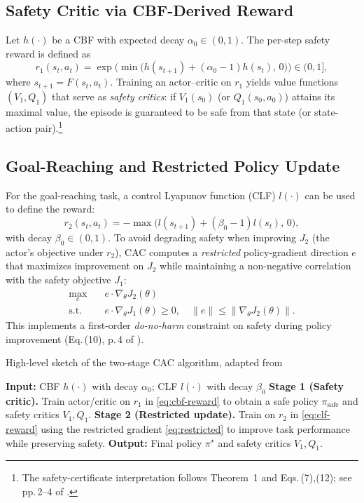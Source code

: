 \documentclass[10pt,conference]{IEEEtran}
\begin{document}
\subsection{Safety Critic via CBF-Derived Reward}
Let $h(\cdot)$ be a CBF with expected decay $\alpha_0\in(0,1)$. The per-step safety reward is defined as
\begin{equation}
r_1(s_t,a_t)=\exp\Big(\min\big(h(s_{t+1})+(\alpha_0-1)h(s_t),\,0\big)\Big)\in(0,1],
\label{eq:cbf-reward}
\end{equation}
where $s_{t+1}=F(s_t,a_t)$. Training an actor--critic on $r_1$ yields value functions $(V_1,Q_1)$ that serve as \emph{safety critics}: if $V_1(s_0)$ (or $Q_1(s_0,a_0)$) attains its maximal value, the episode is guaranteed to be safe from that state (or state-action pair).\footnote{The safety-certificate interpretation follows Theorem~1 and Eqs.\,(7),(12); see pp.\,2–4 of \cite{Xie2025CAC}.}

\subsection{Goal-Reaching and Restricted Policy Update}
For the goal-reaching task, a control Lyapunov function (CLF) $l(\cdot)$ can be used to define the reward:
\begin{equation}
r_2(s_t,a_t)=-\max\big(l(s_{t+1})+(\beta_0-1)l(s_t),\,0\big),
\label{eq:clf-reward}
\end{equation}
with decay $\beta_0\in(0,1)$. To avoid degrading safety when improving $J_2$ (the actor’s objective under $r_2$), CAC computes a \emph{restricted} policy-gradient direction $e$ that maximizes improvement on $J_2$ while maintaining a non-negative correlation with the safety objective $J_1$:
\begin{align}
\max_{e} \quad & e\cdot\nabla_\theta J_2(\theta) \nonumber\\
\text{s.t.}\quad & e\cdot\nabla_\theta J_1(\theta)\ge 0, \quad \|e\| \le \|\nabla_\theta J_2(\theta)\|.
\label{eq:restricted}
\end{align}
This implements a first-order \emph{do-no-harm} constraint on safety during policy improvement (Eq.\,(10), p.\,4 of \cite{Xie2025CAC}).

\begin{algorithm}[t]
\caption{High-level sketch of the two-stage CAC algorithm, adapted from \cite{Xie2025CAC}}
\begin{algorithmic}[1]
\State \textbf{Input:} CBF $h(\cdot)$ with decay $\alpha_0$; CLF $l(\cdot)$ with decay $\beta_0$
\State \textbf{Stage 1 (Safety critic).} Train actor/critic on $r_1$ in \eqref{eq:cbf-reward} to obtain a safe policy $\pi_{\text{safe}}$ and safety critics $V_1, Q_1$.
\State \textbf{Stage 2 (Restricted update).} Train on $r_2$ in \eqref{eq:clf-reward} using the restricted gradient \eqref{eq:restricted} to improve task performance while preserving safety.
\State \textbf{Output:} Final policy $\pi^\star$ and safety critics $V_1, Q_1$.
\end{algorithmic}
\end{algorithm}
\end{document}

